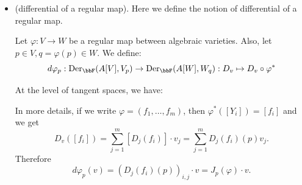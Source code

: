 \begin{itemize}
  \begin{example}
   Let $C=V(f_1,f_2), f_1 = X_1 - X_3^2, f_2 = X_2- X_3^3$. We have 
   \begin{equation}
    A[C] =\frac{\bbF[X_1,X_2,X_3]}{(f_1,f_2)}\to \bbF[X_3]:[g]\mapsto g(X_3^3,X_3^2,X_3).
   \end{equation}
   So $A[C]$ is a domain and we can define $K=\text{Frac}(A[C])$. We compute 
   \begin{equation}
    \text{Rank}_K([D_i(f_j)]) =
    \text{Rank}_K\begin{pmatrix}
       1&0& -2[X_3]\\ 0&1&-3[X_3]
    \end{pmatrix}=
    2.
   \end{equation}
   Then we conclude $\dim(V) = 3 - 2 =1$.
  \end{example}
  \item(differential of a regular map). Here we define the notion of differential of a regular map.
  \begin{definition}
    Let $\varphi:V\to W$ be a regular map between algebraic varieties. Also, let $p\in V, q = \varphi(p)\in W$. We define:
    \begin{equation}
        d\varphi_p: \text{Der}_{\bbF}(A[V],V_p)\to\text{Der}_{\bbF}(A[W],W_q):D_v\mapsto D_v\circ\varphi^*
    \end{equation}
  \end{definition}
  At the level of tangent spaces, we have:
  \begin{center}
  \end{center}

  In more details, if we write $\varphi=(f_1,\dots, f_m)$, then $\varphi^*([Y_i])=[f_i]$ and we get 
  \begin{equation}
    D_v([f_i]) = \sum_{j=1}^m[D_j(f_i)]\cdot v_j = \sum_{j=1}^m D_j(f_i)(p)v_j.
  \end{equation}
  Therefore 
  \begin{equation}
    d\varphi_p(v) = (D_j(f_i)(p))_{i,j} \cdot v = J_p(\varphi)\cdot v.
  \end{equation}


\end{itemize}
